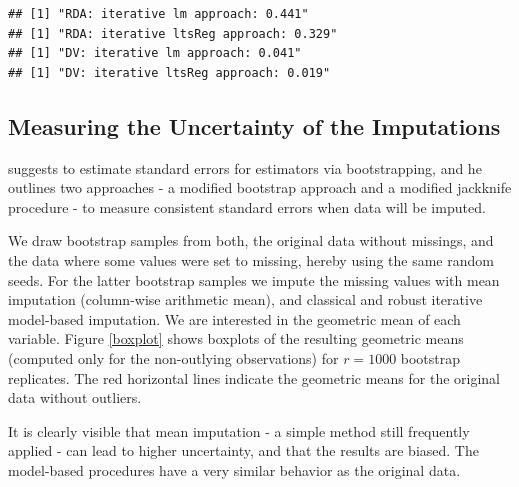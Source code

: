 \documentclass{scrartcl}\usepackage[]{graphicx}\usepackage[]{color}
\makeatletter
\newenvironment{kframe}{%
 \def\at@end@of@kframe{}%
 \ifinner\ifhmode%
  \def\at@end@of@kframe{\end{minipage}}%
  \begin{minipage}{\columnwidth}%
 \fi\fi%
 \def\FrameCommand##1{\hskip\@totalleftmargin \hskip-\fboxsep
 \colorbox{shadecolor}{##1}\hskip-\fboxsep
     \hskip-\linewidth \hskip-\@totalleftmargin \hskip\columnwidth}%
 \MakeFramed {\advance\hsize-\width
   \@totalleftmargin\z@ \linewidth\hsize
   \@setminipage}}%
 {\par\unskip\endMakeFramed%
 \at@end@of@kframe}
\newenvironment{knitrout}{}{} %
\makeatother
\begin{document}
\begin{knitrout}
\color{fgcolor}\begin{kframe}
\begin{verbatim}
## [1] "RDA: iterative lm approach: 0.441"
## [1] "RDA: iterative ltsReg approach: 0.329"
## [1] "DV: iterative lm approach: 0.041"
## [1] "DV: iterative ltsReg approach: 0.019"
\end{verbatim}
\end{kframe}
\end{knitrout}

\subsection{Measuring the Uncertainty of the Imputations}

\cite{Little87} suggests to estimate standard errors for estimators via bootstrapping,
and he outlines two approaches - a modified bootstrap approach and 
a modified jackknife procedure - to measure consistent 
standard errors when data will be imputed.

We draw bootstrap samples from both, the original data without missings,
and the data where some values were set to missing, hereby using the same
random seeds.
For the latter bootstrap samples we impute the missing values
with mean imputation (column-wise arithmetic mean), and classical and
robust iterative model-based imputation.
We are interested in the geometric mean of each variable.
Figure \ref{boxplot} shows boxplots of the resulting geometric means
(computed only for the non-outlying observations)
for $r=1000$ bootstrap replicates.
The red horizontal lines indicate the geometric means for the original data
without outliers.

It is clearly visible that mean imputation - a simple method still frequently
applied - can lead to higher uncertainty,
and that the results are biased.
The model-based procedures have a very similar behavior as the original data.

\end{document}
